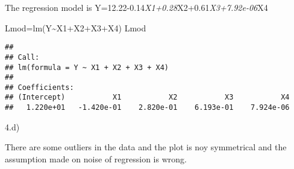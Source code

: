 \documentclass[
]{article}
\newenvironment{Shaded}{\begin{snugshade}}{\end{snugshade}}
\newcommand{\FunctionTok}[1]{\textcolor[rgb]{0.00,0.00,0.00}{#1}}
\newcommand{\NormalTok}[1]{#1}
\newcommand{\OtherTok}[1]{\textcolor[rgb]{0.56,0.35,0.01}{#1}}
\newcommand{\SpecialCharTok}[1]{\textcolor[rgb]{0.00,0.00,0.00}{#1}}
\begin{document}
The regression model is
Y=12.22-0.14\emph{X1+0.28}X2+0.61\emph{X3+7.92e-06}X4

\begin{Shaded}
\begin{Highlighting}[]
\NormalTok{Lmod}\OtherTok{=}\FunctionTok{lm}\NormalTok{(Y}\SpecialCharTok{\textasciitilde{}}\NormalTok{X1}\SpecialCharTok{+}\NormalTok{X2}\SpecialCharTok{+}\NormalTok{X3}\SpecialCharTok{+}\NormalTok{X4)}
\NormalTok{Lmod}
\end{Highlighting}
\end{Shaded}

\begin{verbatim}
## 
## Call:
## lm(formula = Y ~ X1 + X2 + X3 + X4)
## 
## Coefficients:
## (Intercept)           X1           X2           X3           X4  
##   1.220e+01   -1.420e-01    2.820e-01    6.193e-01    7.924e-06
\end{verbatim}

4.d)

There are some outliers in the data and the plot is noy symmetrical and
the assumption made on noise of regression is wrong.

\begin{Shaded}
\end{Shaded}
\end{document}
